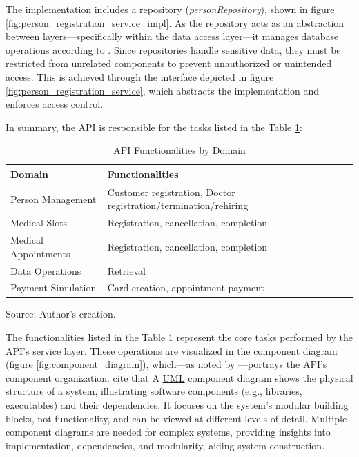 The implementation includes a repository (\textit{personRepository}), shown in figure \ref{fig:person_registration_service_impl}. 
As the repository acts as an abstraction between layers—specifically within the data access layer—it manages database operations according to \cite{prajapati2019asp}. Since repositories handle sensitive data, they must be restricted from unrelated components to prevent unauthorized or 
unintended access. This is achieved through the interface depicted in figure \ref{fig:person_registration_service}, which abstracts the implementation and enforces access control.

In summary, the API is responsible for the tasks listed in the Table \ref{api_functionalities_grouped}:

\begin{table}[H]
\centering
\caption{API Functionalities by Domain}
\label{api_functionalities_grouped}
\begin{tabular}{p{}p{}}
\toprule
\textbf{Domain} & \textbf{Functionalities} \\
\midrule
Person Management & Customer registration, Doctor registration/termination/rehiring \\ \hline
Medical Slots & Registration, cancellation, completion \\ \hline
Medical Appointments & Registration, cancellation, completion \\ \hline
Data Operations & Retrieval \\ \hline
Payment Simulation & Card creation, appointment payment \\
\bottomrule
\end{tabular}
\footnotesize Source: Author's creation.
\end{table}

The functionalities listed in the Table 
\ref{api_functionalities_grouped} represent the core tasks performed by the API's service layer. These operations are visualized in the component diagram (figure \ref{fig:component_diagram}), which—as noted by \cite{rajagopal2017study}—portrays the API's component organization. \cite{bell2003uml, rajput2015uml} cite that A \hyperref[appendix:glossary]{UML} component diagram shows the physical structure of a system, illustrating software components (e.g., libraries, executables) and their dependencies. It focuses on the system's modular building blocks, not functionality, and can be viewed at different levels of detail. Multiple component diagrams are needed for complex systems, providing insights into implementation, dependencies, and modularity, aiding system construction.

